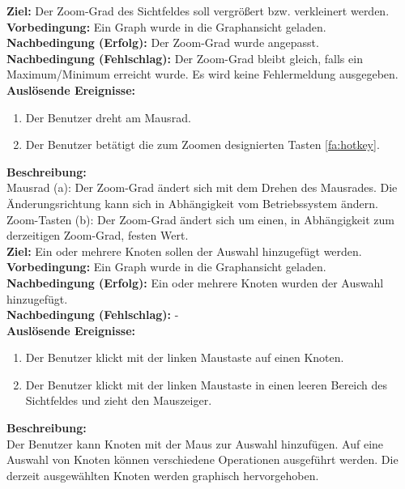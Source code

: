 \label{fa:zoom}
\textbf{Ziel:} Der Zoom-Grad des Sichtfeldes soll vergrößert bzw. verkleinert werden.\\
\textbf{Vorbedingung:} Ein Graph wurde in die Graphansicht geladen.\\
\textbf{Nachbedingung (Erfolg):} Der Zoom-Grad wurde angepasst.\\
\textbf{Nachbedingung (Fehlschlag):} Der Zoom-Grad bleibt gleich, falls ein Maximum/Minimum erreicht wurde. Es wird keine Fehlermeldung ausgegeben.\\
\textbf{Auslösende Ereignisse:}
\begin{enumerate}[nolistsep, label=(\alph*)]
  \item Der Benutzer dreht am Mausrad.
  \item Der Benutzer betätigt die zum Zoomen designierten Tasten \ref{fa:hotkey}.
\end{enumerate}
\textbf{Beschreibung:}\\
Mausrad (a): Der Zoom-Grad ändert sich mit dem Drehen des Mausrades. Die Änderungsrichtung kann sich in Abhängigkeit vom Betriebssystem ändern.\\
Zoom-Tasten (b): Der Zoom-Grad ändert sich um einen, in Abhängigkeit zum derzeitigen Zoom-Grad, festen Wert.\\

\label{fa:selekt_knoten}
\textbf{Ziel:} Ein oder mehrere Knoten sollen der Auswahl hinzugefügt werden.\\
\textbf{Vorbedingung:} Ein Graph wurde in die Graphansicht geladen.\\
\textbf{Nachbedingung (Erfolg):} Ein oder mehrere Knoten wurden der Auswahl hinzugefügt.\\
\textbf{Nachbedingung (Fehlschlag):} -\\
\textbf{Auslösende Ereignisse:}
\begin{enumerate}[nolistsep, label=(\alph*)]
  \item Der Benutzer klickt mit der linken Maustaste auf einen Knoten.
  \item Der Benutzer klickt mit der linken Maustaste in einen leeren Bereich des Sichtfeldes und zieht den Mauszeiger.
\end{enumerate}
\textbf{Beschreibung:}\\
Der Benutzer kann Knoten mit der Maus zur Auswahl hinzufügen.
Auf eine Auswahl von Knoten können verschiedene Operationen ausgeführt werden. %
Die derzeit ausgewählten Knoten werden graphisch hervorgehoben.\\

